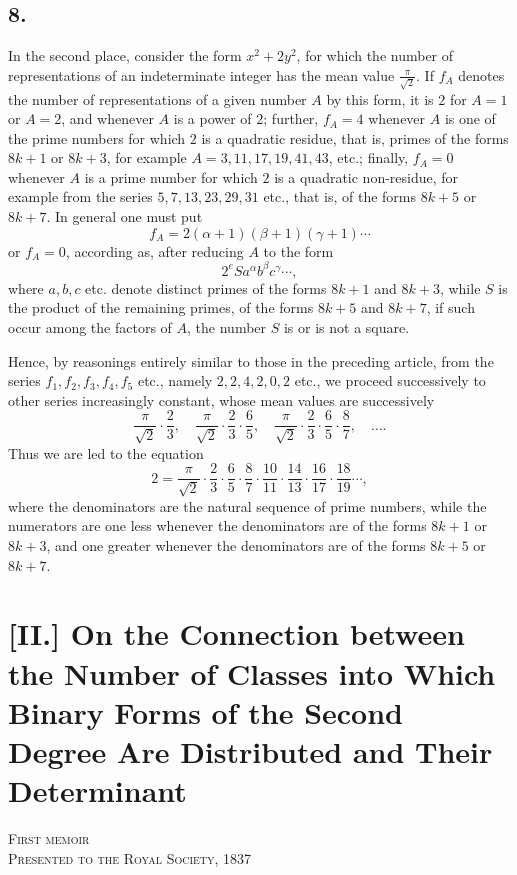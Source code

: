 \documentclass[12pt]{article}
\begin{document}
\subsection*{8.}

In the second place, consider the form $x^2+2y^2$, for which the number of representations of an indeterminate integer has the mean value $\frac{\pi}{\sqrt2}$. If $f_A$ denotes the number of representations of a given number $A$ by this form, it is $2$ for $A=1$ or $A=2$, and whenever $A$ is a power of $2$; further, $f_A=4$ whenever $A$ is one of the prime numbers for which $2$ is a quadratic residue, that is, primes of the forms $8k+1$ or $8k+3$, for example $A=3,11,17,19,41,43$, etc.; finally, $f_A=0$ whenever $A$ is a prime number for which $2$ is a quadratic non-residue, for example from the series $5,7,13,23,29,31$ etc., that is, of the forms $8k+5$ or $8k+7$. In general one must put
\[
f_A=2(\alpha+1)(\beta+1)(\gamma+1)\cdots
\]
or $f_A=0$, according as, after reducing $A$ to the form
\[
2^e S a^\alpha b^\beta c^\gamma\cdots,
\]
where $a,b,c$ etc. denote distinct primes of the forms $8k+1$ and $8k+3$, while $S$ is the product of the remaining primes, of the forms $8k+5$ and $8k+7$, if such occur among the factors of $A$, the number $S$ is or is not a square.

Hence, by reasonings entirely similar to those in the preceding article, from the series $f_1,f_2,f_3,f_4,f_5$ etc., namely $2,2,4,2,0,2$ etc., we proceed successively to other series increasingly constant, whose mean values are successively
\[
\frac{\pi}{\sqrt2}\cdot\frac23,\quad
\frac{\pi}{\sqrt2}\cdot\frac23\cdot\frac65,\quad
\frac{\pi}{\sqrt2}\cdot\frac23\cdot\frac65\cdot\frac87,\quad \ldots.
\]
Thus we are led to the equation
\[
2=\frac{\pi}{\sqrt2}\cdot\frac23\cdot\frac65\cdot\frac87\cdot\frac{10}{11}\cdot\frac{14}{13}\cdot\frac{16}{17}\cdot\frac{18}{19}\cdots,
\]
where the denominators are the natural sequence of prime numbers, while the numerators are one less whenever the denominators are of the forms $8k+1$ or $8k+3$, and one greater whenever the denominators are of the forms $8k+5$ or $8k+7$.



\section*{[II.] On the Connection between the Number of Classes into Which Binary Forms of the Second Degree Are Distributed and Their Determinant}

\begin{center}
\textsc{First memoir}\\
\textsc{Presented to the Royal Society, 1837}
\end{center}
\end{document}

